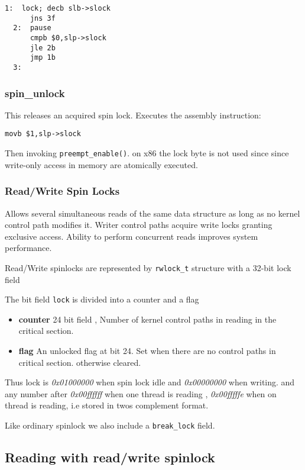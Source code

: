 \documentclass{article}
\begin{document}
\begin{lstlisting}[language=anX86]
  1:  lock; decb slb->slock
      jns 3f
  2:  pause
      cmpb $0,slp->slock
      jle 2b
      jmp 1b
  3: 
\end{lstlisting}

\subsubsection{spin\_unlock}

This releases an acquired spin lock. Executes the assembly instruction:


\begin{lstlisting}[language=anX86]
  movb $1,slp->slock
\end{lstlisting}

Then invoking \lstinline{preempt_enable()}. on x86 the lock byte is
not used since since write-only access in memory are atomically
executed.

\subsubsection{Read/Write Spin Locks}

Allows several simultaneous reads of the same data structure as long
as no kernel control path modifies it. Writer control paths acquire
write locks granting exclusive access. Ability to perform concurrent
reads improves system performance.

Read/Write spinlocks are represented by \lstinline{rwlock_t} structure
with a 32-bit lock field

The bit field \lstinline{lock} is divided into a counter and a flag
\begin{itemize}
\item \textbf{counter} 24 bit field , Number of kernel control paths
  in reading in the critical section.
  \item \textbf{flag} An unlocked flag at bit 24. Set when there are no
    control paths in critical section. otherwise cleared.
\end{itemize}

Thus lock is \emph{0x01000000} when spin lock idle and
\emph{0x00000000} when writing. and any number after \emph{0x00ffffff}
when one thread is reading , \emph{0x00fffffe} when on thread is
reading, i.e stored in twos complement format.

Like ordinary spinlock we also include a \lstinline{break_lock} field.

\subsection{Reading with read/write spinlock}
\end{document}
